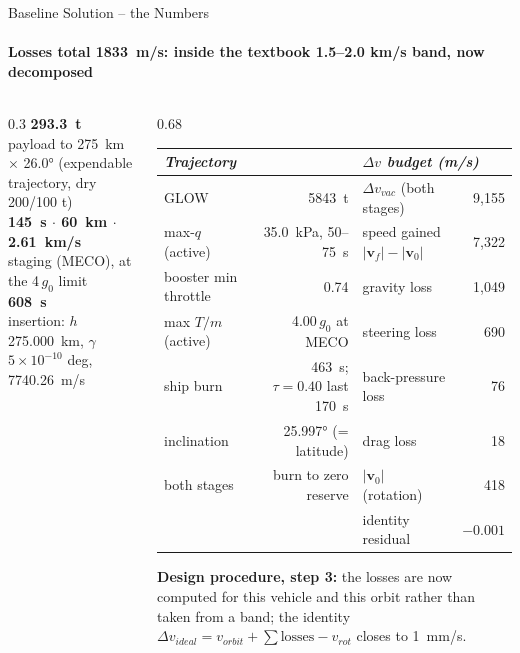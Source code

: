 \documentclass[aspectratio=169,10pt]{beamer}
\providecommand{\dv}{\Delta v}\providecommand{\gz}{g_0}\providecommand{\pc}{p_c}\providecommand{\dd}{\mathrm{d}}\providecommand{\eps}{\varepsilon}
\providecommand{\stepbox}[2]{\begin{tcolorbox}[colback=PMS284C!15,colframe=PMS280C,boxrule=0.5pt,left=3pt,right=3pt,top=0pt,bottom=0pt,arc=1pt,boxsep=1pt]\footnotesize\textbf{Design procedure, step #1:} #2\end{tcolorbox}}
\newcommand{\stat}[2]{{\color{PMS7635C}\textbf{\large #1}}\\[-1pt]{\scriptsize\color{gray}#2}}
\begin{document}
\begin{frame}{Baseline Solution -- the Numbers}
  \framesubtitle{Losses total \SI{1833}{m/s}: inside the textbook 1.5--2.0 km/s band, now decomposed}
  \begin{columns}[T]
    \begin{column}{0.3\textwidth}
      \stat{\SI{293.3}{\tonne}}{payload to \SI{275}{km} $\times$ \ang{26.0} (expendable trajectory, dry 200/100 t)}\\[8pt]
      {\color{PMS7635C}\textbf{\SI{145}{s} $\cdot$ \SI{60}{km} $\cdot$ \SI{2.61}{km/s}}}\\[-1pt]{\scriptsize\color{gray}staging (MECO), at the 4\,$\gz$ limit}\\[8pt]
      \stat{\SI{608}{s}}{insertion: $h$ \SI{275.000}{km}, $\gamma$ $5\!\times\!10^{-10}$ deg, \SI{7740.26}{m/s}}
    \end{column}
    \begin{column}{0.68\textwidth}
      \scriptsize
      \begin{tabular}{lr@{\quad}lr}
        \toprule
        \multicolumn{2}{l}{\textit{Trajectory}} & \multicolumn{2}{l}{\textit{$\dv$ budget (m/s)}} \\
        \midrule
        GLOW & \SI{5843}{\tonne} & $\dv_{vac}$ (both stages) & 9,155 \\
        max-$q$ (active) & \SI{35.0}{kPa}, 50--\SI{75}{s} & speed gained $|\bm v_f|-|\bm v_0|$ & 7,322 \\
        booster min throttle & 0.74 & gravity loss & 1,049 \\
        max $T/m$ (active) & 4.00\,$\gz$ at MECO & steering loss & 690 \\
        ship burn & \SI{463}{s}; $\tau=0.40$ last \SI{170}{s} & back-pressure loss & 76 \\
        inclination & \ang{25.997} (= latitude) & drag loss & 18 \\
        both stages & burn to zero reserve & $|\bm v_0|$ (rotation) & 418 \\
         & & identity residual & $-0.001$ \\
        \bottomrule
      \end{tabular}
      \vspace{6pt}

      \stepbox{3}{the losses are now computed for this vehicle and this orbit rather than taken from a band; the identity $\dv_{ideal}=v_{orbit}+\sum\text{losses}-v_{rot}$ closes to \SI{1}{mm/s}.}
    \end{column}
  \end{columns}
\end{frame}
\end{document}
